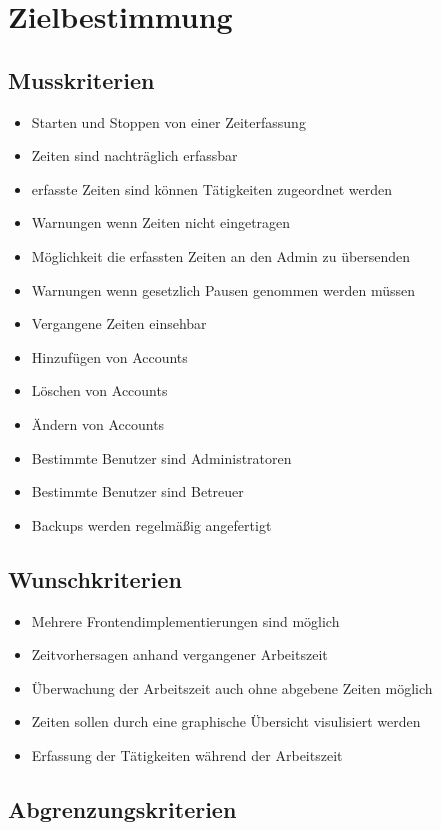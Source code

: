 \section{Zielbestimmung}

\subsection{Musskriterien}

\begin{itemize}
    \item Starten und Stoppen von einer Zeiterfassung
    \item Zeiten sind nachträglich erfassbar
    \item erfasste Zeiten sind können Tätigkeiten zugeordnet werden
    \item Warnungen wenn Zeiten nicht eingetragen
    \item Möglichkeit die erfassten Zeiten an den Admin zu übersenden
    \item Warnungen wenn gesetzlich Pausen genommen werden müssen
    \item Vergangene Zeiten einsehbar
    \item Hinzufügen von Accounts
    \item Löschen von Accounts
    \item Ändern von Accounts
    \item Bestimmte Benutzer sind Administratoren
    \item Bestimmte Benutzer sind Betreuer
    \item Backups werden regelmäßig angefertigt
\end{itemize}


\subsection{Wunschkriterien}

\begin{itemize}
    \item Mehrere Frontendimplementierungen sind möglich
    \item Zeitvorhersagen anhand vergangener Arbeitszeit
    \item Überwachung der Arbeitszeit auch ohne abgebene Zeiten möglich
    \item Zeiten sollen durch eine graphische Übersicht visulisiert werden
    \item Erfassung der Tätigkeiten während der Arbeitszeit

\end{itemize}


\subsection{Abgrenzungskriterien}
\begin{itemize}

\end{itemize}